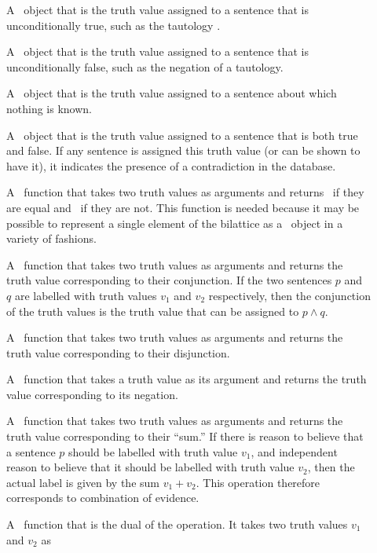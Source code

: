 \begin{description}
 \item [] A \lisp\ object that is the truth value assigned
to a sentence that is unconditionally true, such as the tautology
.
 \item [] A \lisp\ object that is the truth value assigned
to a sentence that is unconditionally false, such as the negation of a
tautology.
 \item [] A \lisp\ object that is the truth value assigned
to a sentence about which nothing is known.
 \item [] A \lisp\ object that is the truth value assigned
to a sentence that is both true and false.  If any sentence is assigned
this truth value (or can be shown to have it), it indicates the presence
of a contradiction in the database.
 \item [] A \lisp\ function that takes two truth values as
arguments and returns \T\ if they are equal and \NIL\ if they are
not.  This function is needed because it may be possible to represent
a single element of the bilattice as a \lisp\ object in a variety of
fashions.
 \item [] A \lisp\ function that takes two truth values as
arguments and returns the truth value corresponding to their
conjunction.  If the two sentences $p$ and $q$ are labelled with
truth values $v_1$ and $v_2$ respectively, then the conjunction of
the truth values is the truth value that can be assigned to $p\wedge q$.
 \item [] A \lisp\ function that takes two truth values as
arguments and returns the truth value corresponding to their
disjunction.
 \item [] A \lisp\ function that takes a truth value as its
argument and returns the truth value corresponding to its negation.
 \item [] A \lisp\ function that takes two truth values as
arguments and returns the truth value corresponding to their ``sum.''
If there is reason to believe that a sentence $p$ should be labelled
with truth value $v_1$, and independent reason to believe that it
should be labelled with truth value $v_2$, then the actual label is
given by the sum $v_1+v_2$.  This operation therefore corresponds to
combination of evidence.
 \item [] A \lisp\ function that is the dual of the
 operation.  It takes two truth values $v_1$ and $v_2$ as

\end{description}
